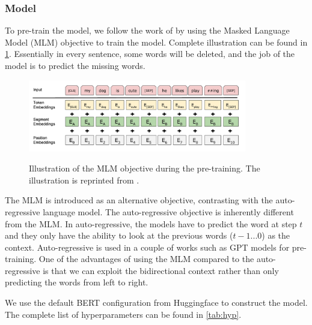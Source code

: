 \subsubsection{Model}
To pre-train the model, we follow the work of \cite{devlin2018bert} by using the Masked Language Model (MLM) objective to train the model. Complete illustration can be found in \cref{img:mlmobj}. Essentially in every sentence, some words will be deleted, and the job of the model is to predict the missing words.

\begin{figure}[h]
    {\includegraphics[width=0.85\textwidth]{img/mlm_obj.png}}
    \centering
    \caption{Illustration of the MLM objective during the pre-training. The illustration is reprinted from \cite{devlin2018bert}.}
    \label{img:mlmobj}
\end{figure}

The MLM is introduced as an alternative objective, contrasting with the auto-regressive language model. The auto-regressive objective is inherently different from the MLM. In auto-regressive, the models have to predict the word at step $t$ and they only have the ability to look at the previous words ($t-1...0$) as the context. Auto-regressive is used in a couple of works such as GPT models  for pre-training.
One of the advantages of using the MLM compared to the auto-regressive is that we can exploit the bidirectional context rather than only predicting the words from left to right.

We use the default BERT configuration from Huggingface to construct the model. The complete list of hyperparameters can be found in \cref{tab:hyp}.

